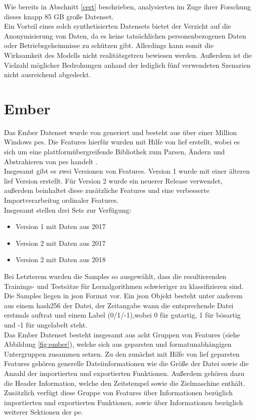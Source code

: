\documentclass[
    12pt, %
    DIV10,
    ngerman, %
    a4paper, %
    oneside, %
    titlepage, %
    parskip=half, %
    headings=normal, %
    listof=totoc, %
    bibliography=totoc, %
    index=totoc, %
    captions=tableheading, %
    final %
]{scrreprt}
\begin{document}
Wie bereits in Abschnitt \ref{cert} beschrieben, analysierten \textcite{Le2019} im Zuge ihrer Forschung dieses knapp 85 GB gro{\ss}e Datenset.\\
Ein Vorteil eines solch synthetisierten Datensets bietet der Verzicht auf die Anonymisierung von Daten, da es keine tatsächlichen personenbezogenen Daten oder Betriebsgeheimnisse zu schützen gibt. Allerdings kann somit die Wirksamkeit des Modells nicht realitätsgetreu bewiesen werden. Au{\ss}erdem ist die Vielzahl möglicher Bedrohungen anhand der lediglich fünf verwendeten Szenarien nicht ausreichend abgedeckt.
\section{Ember}\label{sec:ember}
Das Ember Datenset wurde von \textcite{anderson2018ember} generiert und besteht aus über einer Million Windows \ac{pes}. Die Features hierfür wurden mit Hilfe von \ac{lief} erstellt, wobei es sich um eine plattformübergreifende Bibliothek zum Parsen, Ändern und Abstrahieren von \ac{pes} handelt \parencite{Quarkslab}.\\
Insgesamt gibt es zwei Versionen von Features. Version 1 wurde mit einer älteren \ac{lief} Version erstellt. Für Version 2 wurde ein neuerer Release verwendet, au{\ss}erdem beinhaltet diese zusätzliche Features und eine verbesserte Importverarbeitug ordinaler Features.\\
Insgesamt stellen \citeauthor{anderson2018ember} drei Sets zur Verfügung:
\begin{itemize}
\item Version 1 mit Daten aus 2017
\item Version 2 mit Daten aus 2017
\item Version 2 mit Daten aus 2018
\end{itemize}
Bei Letzterem wurden die Samples so ausgewählt, dass die resultierenden Trainings- und Testsätze für Lernalgorithmen schwieriger zu klassifizieren sind.\\
Die Samples liegen in \ac{json} Format vor. Ein \ac{json} Objekt besteht unter anderem aus einem hash256 der Datei, der Zeitangabe wann die entsprechende Datei erstmals auftrat und einem Label (0/1/-1),wobei 0 für gutartig, 1 für bösartig und -1 für ungelabelt steht.\\
Das Ember Datenset besteht insgesamt aus acht Gruppen von Features (siehe Abbildung \ref{fig:ember}), welche sich aus geparsten und formatunabhängigen Untergruppen zusammen setzen. Zu den zunächst mit Hilfe von \ac{lief} geparsten Features gehören generelle Dateiinformationen wie die Grö{\ss}e der Datei sowie die Anzahl der importierten und exportierten Funktionen. Au{\ss}erdem gehören dazu die Header Information, welche den Zeitstempel sowie die Zielmaschine enthält. Zusätzlich verfügt diese Gruppe von Features über Informationen bezüglich importierten und exportierten Funktionen, sowie über Informationen bezüglich weiterer Sektionen der \ac{pe}.
\end{document}
